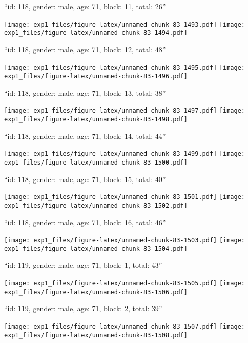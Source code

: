 \documentclass[11pt,,]{article}
\begin{document}
\newpage
[1] 

``id: 118, gender: male, age: 71, block: 11, total: 26''

\texttt{[image: exp1\_files/figure-latex/unnamed-chunk-83-1493.pdf]}
\texttt{[image: exp1\_files/figure-latex/unnamed-chunk-83-1494.pdf]}

\newpage
[1] 

``id: 118, gender: male, age: 71, block: 12, total: 48''

\texttt{[image: exp1\_files/figure-latex/unnamed-chunk-83-1495.pdf]}
\texttt{[image: exp1\_files/figure-latex/unnamed-chunk-83-1496.pdf]}

\newpage
[1] 

``id: 118, gender: male, age: 71, block: 13, total: 38''

\texttt{[image: exp1\_files/figure-latex/unnamed-chunk-83-1497.pdf]}
\texttt{[image: exp1\_files/figure-latex/unnamed-chunk-83-1498.pdf]}

\newpage
[1] 

``id: 118, gender: male, age: 71, block: 14, total: 44''

\texttt{[image: exp1\_files/figure-latex/unnamed-chunk-83-1499.pdf]}
\texttt{[image: exp1\_files/figure-latex/unnamed-chunk-83-1500.pdf]}

\newpage
[1] 

``id: 118, gender: male, age: 71, block: 15, total: 40''

\texttt{[image: exp1\_files/figure-latex/unnamed-chunk-83-1501.pdf]}
\texttt{[image: exp1\_files/figure-latex/unnamed-chunk-83-1502.pdf]}

\newpage
[1] 

``id: 118, gender: male, age: 71, block: 16, total: 46''

\texttt{[image: exp1\_files/figure-latex/unnamed-chunk-83-1503.pdf]}
\texttt{[image: exp1\_files/figure-latex/unnamed-chunk-83-1504.pdf]}

\newpage
[1] 

``id: 119, gender: male, age: 71, block: 1, total: 43''

\texttt{[image: exp1\_files/figure-latex/unnamed-chunk-83-1505.pdf]}
\texttt{[image: exp1\_files/figure-latex/unnamed-chunk-83-1506.pdf]}

\newpage
[1] 

``id: 119, gender: male, age: 71, block: 2, total: 39''

\texttt{[image: exp1\_files/figure-latex/unnamed-chunk-83-1507.pdf]}
\texttt{[image: exp1\_files/figure-latex/unnamed-chunk-83-1508.pdf]}
\end{document}

